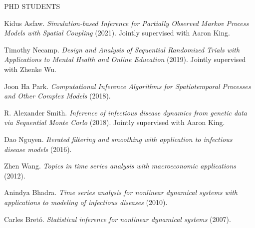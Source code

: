 \begin{reflist}{PHD STUDENTS}

\item{Kidus Asfaw.} {\it Simulation-based Inference for Partially Observed Markov Process Models with Spatial Coupling} (2021). Jointly supervised with Aaron King.


\item{Timothy Necamp.} {\it Design and Analysis of Sequential Randomized Trials with Applications to Mental Health and Online Education} (2019). Jointly supervised with Zhenke Wu. 

\item{Joon Ha Park.} {\it Computational Inference Algorithms for Spatiotemporal Processes and Other Complex Models} (2018). 

 \item{R. Alexander Smith.} {\it Inference of infectious disease dynamics from genetic data via Sequential Monte Carlo} (2018). Jointly supervised with Aaron King. 

 \item{Dao Nguyen.} {\it Iterated filtering and smoothing with application to infectious disease models} (2016). 

\item{Zhen Wang.} {\it Topics in time series analysis with macroeconomic applications} (2012). 

\item{Anindya Bhadra.} {\it Time series analysis for nonlinear dynamical systems with applications to modeling of infectious diseases} (2010).

\item{Carles Bret\'{o}.} {\it Statistical inference for nonlinear dynamical systems} (2007). 


\end{reflist}

\lsp

